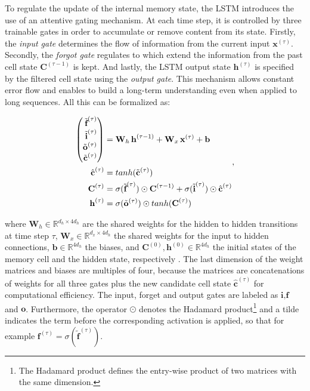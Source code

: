 To regulate the update of the internal memory state, the LSTM introduces the use of an attentive gating mechanism. At each time step, it is controlled by three trainable gates in order to accumulate or remove content from its state. Firstly, the \textit{input gate} determines the flow of information from the current input $ \textbf{x}^{(\tau)} $. Secondly, the \textit{forgot gate} regulates to which extend the information from the past cell state $\textbf{C}^{(\tau-1)}$ is kept. And lastly, the LSTM output state $\textbf{h}^{(\tau)}$ is specified by the filtered cell state using the \textit{output gate}. This mechanism allows constant error flow and enables to build a long-term understanding even when applied to long sequences. All this can be formalized as:

\begin{equation} \label{eq:lstm}
\begin{aligned}
\Spvek{\tilde{\textbf{f}}^{(\tau)}; \tilde{\textbf{i}}^{(\tau)}; \tilde{\textbf{o}}^{(\tau)}; \tilde{\textbf{c}}^{(\tau)}} &= \textbf{W}_{h} \, \textbf{h}^{(\tau-1)} + \textbf{W}_{x} \, \textbf{x}^{(\tau)} + \textbf{b} \\
\hat{\textbf{c}}^{(\tau)} &= tanh(\tilde{\textbf{c}}^{(\tau)}) \\
\textbf{C}^{(\tau)} &= \sigma(\tilde{\textbf{f}}^{(\tau)}) \odot \textbf{C}^{(\tau-1)} + \sigma(\tilde{\textbf{i}}^{(\tau)}) \odot \hat{\textbf{c}}^{(\tau)} \\
\textbf{h}^{(\tau)} &= \sigma(\tilde{\textbf{o}}^{(\tau)}) \odot tanh(\textbf{C}^{(\tau)})
\end{aligned} ,
\end{equation}

where $ \textbf{W}_h \in \mathbb{R}^{d_h \times 4d_h} $ are the shared weights for the hidden to hidden transitions at time step $ \tau $, $ \textbf{W}_x \in \mathbb{R}^{d_x \times 4d_h} $ the shared weights for the input to hidden connections, $ \textbf{b} \in \mathbb{R}^{4d_h} $ the biases, and $ \textbf{C}^{(0)}, \textbf{h}^{(0)} \in \mathbb{R}^{4d_h} $ the initial states of the memory cell and the hidden state, respectively \parencite{rnn-batchnorm}. The last dimension of the weight matrices and biases are multiples of four, because the matrices are concatenations of weights for all three gates plus the new candidate cell state $ \hat{\textbf{c}}^{(\tau)} $ for computational efficiency. The input, forget and output gates are labeled as $ \textbf{i}, \textbf{f} $ and $ \textbf{o} $. Furthermore, the operator $ \odot $ denotes the Hadamard product\footnote{The Hadamard product defines the entry-wise product of two matrices with the same dimension.} and a tilde indicates the term before the corresponding activation is applied, so that for example $ \textbf{f}^{(\tau)} = \sigma(\tilde{\textbf{f}}^{(\tau)}) $.


